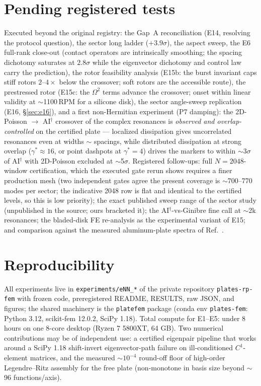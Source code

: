 \documentclass[11pt]{article}
\begin{document}
\section{Pending registered tests}

Executed beyond the original registry: the Gap~A reconciliation (E14,
resolving the protocol question), the sector long ladder ($+3.9\sigma$),
the aspect sweep, the E6 full-rank close-out (contact operators are
intrinsically smoothing; the spacing dichotomy saturates at $2.8\sigma$
while the eigenvector dichotomy and control law carry the prediction), the
rotor feasibility analysis (E15b: the burst invariant caps stiff rotors
$2$--$4\times$ below the crossover; soft rotors are the accessible route),
the prestressed rotor (E15c: the $\Omega^2$ terms advance the crossover;
onset within linear validity at $\sim$1100\,RPM for a silicone disk),
the sector angle-sweep replication (E16, \S\ref{sec:e16}),
and a first non-Hermitian experiment (P7 damping): the 2D-Poisson $\to$
AI$^\dagger$ crossover of the complex resonances is \emph{observed and
overlap-controlled} on the certified plate --- localized dissipation gives
uncorrelated resonances even at widths $\sim$ spacings, while distributed
dissipation at strong overlap ($\gamma^*\!\approx\!16$, or point dashpots
at $\gamma^*\!=\!4$) drives the markers to within $\sim$3$\sigma$ of
AI$^\dagger$ with 2D-Poisson excluded at $\sim$5$\sigma$. Registered follow-ups: full $N=2048$-window certification, which the
executed gate rerun shows requires a finer production mesh (two
independent gates agree the present coverage is $\sim$700--770 modes per
sector; the indicative 2048 row is flat and identical to the certified
levels, so this is low priority); the exact
published sweep range of the sector study (unpublished in the source;
ours bracketed it); the AI$^\dagger$-vs-Ginibre fine call at $\sim$2k resonances; the
bladed-disk FE re-analysis as the experimental variant of E15; and
comparison against the measured aluminum-plate spectra of
Ref.~\cite{lopez2021}.

\section{Reproducibility}

All experiments live in \texttt{experiments/eNN\_*} of the private
repository \texttt{plates-rp-fem} with frozen code, preregistered README,
RESULTS, raw JSON, and figures; the shared machinery is the
\texttt{platefem} package (conda env \texttt{plates-fem}: Python 3.12,
scikit-fem 12.0.2, SciPy 1.18). Total compute for E1--E5: under 8 hours on
one 8-core desktop (Ryzen 7 5800XT, 64 GB). Two numerical contributions may
be of independent use: a certified eigenpair pipeline that works around a
SciPy 1.18 shift-invert eigenvector-path failure on ill-conditioned
$C^1$-element matrices, and the measured $\sim10^{-4}$ round-off floor of
high-order Legendre--Ritz assembly for the free plate (non-monotone in basis
size beyond $\sim$96 functions/axis).
\end{document}
